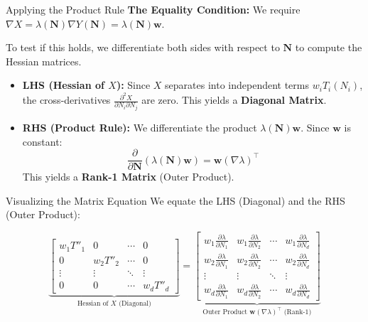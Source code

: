 \documentclass{beamer}
\begin{document}
\begin{frame}{Applying the Product Rule}
  \textbf{The Equality Condition:}
  We require $\nabla X = \lambda(\mathbf{N}) \nabla Y(\mathbf{N}) = \lambda(\mathbf{N}) \mathbf{w}$.
  
  To test if this holds, we differentiate both sides with respect to $\mathbf{N}$ to compute the Hessian matrices.
  
  \begin{itemize}
    \item \textbf{LHS (Hessian of $X$):}
      Since $X$ separates into independent terms $w_i T_i(N_i)$, the cross-derivatives $\frac{\partial^2 X}{\partial N_i \partial N_j}$ are zero. This yields a \textbf{Diagonal Matrix}.

    \item \textbf{RHS (Product Rule):}
      We differentiate the product $\lambda(\mathbf{N}) \mathbf{w}$. Since $\mathbf{w}$ is constant:
      \[ \frac{\partial}{\partial \mathbf{N}} \left( \lambda(\mathbf{N}) \mathbf{w} \right) = \mathbf{w} (\nabla \lambda)^\top \]
      This yields a \textbf{Rank-1 Matrix} (Outer Product).
  \end{itemize}
\end{frame}

\begin{frame}{Visualizing the Matrix Equation}
  We equate the LHS (Diagonal) and the RHS (Outer Product):
  
  \[
    \underbrace{
    \begin{bmatrix} 
    w_1 T''_1 & 0 & \cdots & 0 \\
    0 & w_2 T''_2 & \cdots & 0 \\
    \vdots & \vdots & \ddots & \vdots \\
    0 & 0 & \cdots & w_d T''_d
    \end{bmatrix}
    }_{\text{Hessian of } X \text{ (Diagonal)}}
    =
    \underbrace{
    \begin{bmatrix}
    w_1 \frac{\partial \lambda}{\partial N_1} & w_1 \frac{\partial \lambda}{\partial N_2} & \cdots & w_1 \frac{\partial \lambda}{\partial N_d} \\
    w_2 \frac{\partial \lambda}{\partial N_1} & w_2 \frac{\partial \lambda}{\partial N_2} & \cdots & w_2 \frac{\partial \lambda}{\partial N_d} \\
    \vdots & \vdots & \ddots & \vdots \\
    w_d \frac{\partial \lambda}{\partial N_1} & w_d \frac{\partial \lambda}{\partial N_2} & \cdots & w_d \frac{\partial \lambda}{\partial N_d}
    \end{bmatrix}
    }_{\text{Outer Product } \mathbf{w} (\nabla \lambda)^\top \text{ (Rank-1)}}
  \]
  
  \vspace{0.3cm}
\end{frame}
\end{document}
